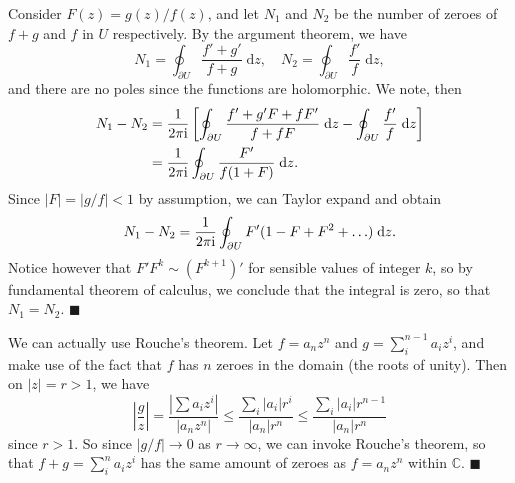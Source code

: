 \documentclass[letter-paper]{tufte-book}
\newenvironment{proof}[1][Proof]{\begin{trivlist}
\item[\hskip \labelsep {\bfseries #1}]}{\end{trivlist}}
\newcommand{\zi}{{\rm i}}
\newcommand{\qed}{\hfill$\blacksquare$}
\begin{document}
\begin{proof}
  Consider $F(z) = g(z) / f(z)$, and let $N_1$ and $N_2$ be the number of zeroes
  of $f+g$ and $f$ in $U$ respectively. By the argument theorem, we have
  \begin{equation*}
    N_1 = \oint_{\partial U} \frac{f'+g'}{f+g}\; \mathrm{d}z, \quad 
    N_2 = \oint_{\partial U} \frac{f'}{f}\; \mathrm{d}z,
  \end{equation*}
  and there are no poles since the functions are holomorphic. We note, then
  \begin{align*}
    N_1 - N_2 &= \frac{1}{2\pi\zi} \left[\oint_{\partial U} \frac{f'+g'F + fF'}{f+fF}\; \mathrm{d}z - \oint_{\partial U} \frac{f'}{f}\; \mathrm{d}z\right]\\
      &=\frac{1}{2\pi\zi}\oint_{\partial U} \frac{F'}{f(1+F)}\; \mathrm{d}z.
  \end{align*}
  Since $|F| = |g/f| < 1$ by assumption, we can Taylor expand and obtain
  \begin{equation*}
    N_1 - N_2 = \frac{1}{2\pi\zi}\oint_{\partial U} F' (1 - F + F^2 + \ldots)\; \mathrm{d}z.
  \end{equation*}
  Notice however that $F'F^k \sim (F^{k+1})'$ for sensible values of integer
  $k$, so by fundamental theorem of calculus, we conclude that the integral is
  zero, so that $N_1 = N_2$.
  \qed
\end{proof}

\begin{proof}[Alternate proof of the Fundamental Theorem of Algebra]
  We can actually use Rouche's theorem. Let $f = a_n z^n$ and $g = \sum_i^{n-1}
  a_i z^i$, and make use of the fact that $f$ has $n$ zeroes in the domain (the
  roots of unity). Then on $|z| = r > 1$, we have
  \begin{equation*}
    \left|\frac{g}{z}\right| = \frac{|\sum a_i z^i|}{|a_n z^n|} \leq \frac{\sum_i |a_i|r^i}{|a_n| r^n} \leq \frac{\sum_i |a_i|r^{n-1}}{|a_n| r^n}
  \end{equation*}
  since $r > 1$. So since $|g/f| \to 0$ as $r\to \infty$, we can invoke Rouche's
  theorem, so that $f + g = \sum_i^n a_i z^i$ has the same amount of zeroes as
  $f = a_n z^n$ within $\mathbb{C}$. \qed
\end{proof}
\end{document}
